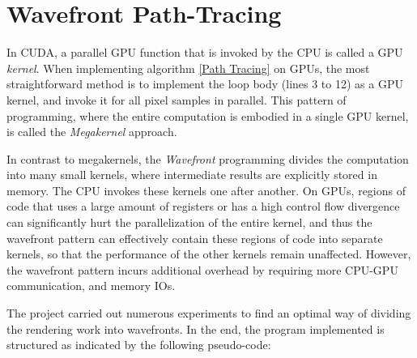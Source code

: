 


\section{Wavefront Path-Tracing}
In CUDA, a parallel GPU function that is invoked by the CPU is called a GPU \textit{kernel}. When implementing algorithm \ref{Path Tracing} on GPUs, the most straightforward method is to implement the loop body (lines 3 to 12) as a GPU kernel, and invoke it for all pixel samples in parallel. This pattern of programming, where the entire computation is embodied in a single GPU kernel, is called the \textit{Megakernel}\cite{megakernel} approach.

In contrast to megakernels, the \textit{Wavefront} programming divides the computation into many small kernels, where intermediate results are explicitly stored in memory. The CPU invokes these kernels one after another. On GPUs, regions of code that uses a large amount of registers or has a high control flow divergence can significantly hurt the parallelization of the entire kernel, and thus the wavefront pattern can effectively contain these regions of code into separate kernels, so that the performance of the other kernels remain unaffected. However, the wavefront pattern incurs additional overhead by requiring more CPU-GPU communication, and memory IOs.

The project carried out numerous experiments to find an optimal way of dividing the rendering work into wavefronts. In the end, the program implemented is structured as indicated by the following pseudo-code:

